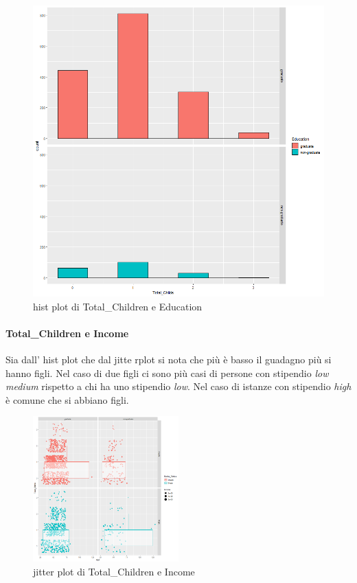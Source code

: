 \documentclass[letterpaper,11pt]{article}
\begin{document}
\begin{figure}[h!]
    \centering
    \includegraphics[width=.6\textwidth]{Img/EDA/EDA018.png}
    \caption{hist plot di Total\_Children e Education}
    \label{fig:fviz_eig(pca, addlabels = TRUE, ylim = c(0, 50))}
\end{figure}



\paragraph{Total\_Children e Income}

Sia dall' hist plot che dal jitte rplot si nota che più è basso il guadagno più si hanno figli. Nel caso di due figli ci sono più casi di persone con stipendio \textit{low medium} rispetto a chi ha uno stipendio \textit{low}. 
Nel caso di istanze con stipendio \textit{high} è comune che si abbiano figli. 


\begin{figure}[h!]
    \centering
    \includegraphics[width=0.5\textwidth]{Img/EDA/EDA021.png}
    \caption{jitter plot di Total\_Children e Income}
    \label{fig:fviz_eig(pca, addlabels = TRUE, ylim = c(0, 50))}
\end{figure}
\end{document}
